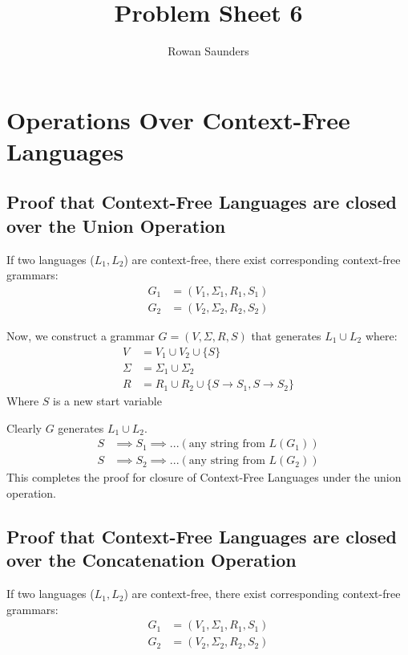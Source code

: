 \documentclass[11pt]{article}
\title{Problem Sheet 6}
\author{Rowan Saunders}
\begin{document}
\begin{titlepage}
	\maketitle
\end{titlepage}

\section{Operations Over Context-Free Languages}

\subsection{Proof that Context-Free Languages are closed over the Union
Operation}
If two languages ($L_1, L_2$) are context-free, there exist corresponding
context-free grammars:
\begin{align*}
G_1 &= (V_1,\Sigma_1, R_1,S_1)\\
G_2 &= (V_2,\Sigma_2, R_2,S_2)
\end{align*}

Now, we construct a grammar $G=(V,\Sigma,R,S)$ that generates $L_1 \cup L_2$
where:
\begin{align*}
V &= V_1 \cup V_2 \cup \{S\} \\
\Sigma &= \Sigma_1 \cup \Sigma_2 \\
R &= R_1 \cup R_2 \cup \{S \to S_1, S \to S_2 \}
\end{align*}
Where $S$ is a new start variable

Clearly $G$ generates $L_1 \cup L_2$.
\begin{align*}
S & \implies S_1 \implies ... (\text{any string from }L(G_1)) \\
S & \implies S_2 \implies ... (\text{any string from }L(G_2))
\end{align*}
This completes the proof for closure of Context-Free Languages under the union
operation.

\subsection{Proof that Context-Free Languages are closed over the Concatenation
Operation}
If two languages ($L_1, L_2$) are context-free, there exist corresponding
context-free grammars:
\begin{align*}
G_1 &= (V_1,\Sigma_1, R_1,S_1)\\
G_2 &= (V_2,\Sigma_2, R_2,S_2)
\end{align*}
\end{document}
